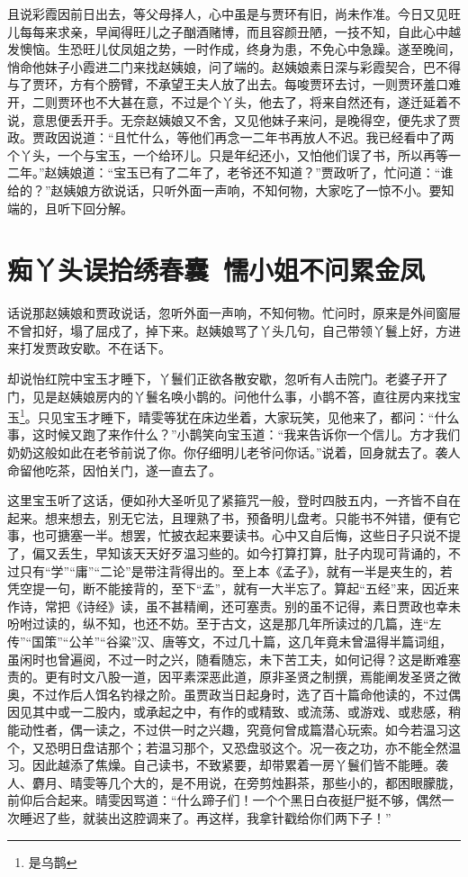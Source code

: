 \documentclass[12pt,oneside]{book}
\begin{document}
且说彩霞因前日出去，等父母择人，心中虽是与贾环有旧，尚未作准。今日又见旺儿每每来求亲，早闻得旺儿之子酗酒赌博，而且容颜丑陋，一技不知，自此心中越发懊恼。生恐旺儿仗凤姐之势，一时作成，终身为患，不免心中急躁。遂至晚间，悄命他妹子小霞进二门来找赵姨娘，问了端的。赵姨娘素日深与彩霞契合，巴不得与了贾环，方有个膀臂，不承望王夫人放了出去。每唆贾环去讨，一则贾环羞口难开，二则贾环也不大甚在意，不过是个丫头，他去了，将来自然还有，遂迁延着不说，意思便丢开手。无奈赵姨娘又不舍，又见他妹子来问，是晚得空，便先求了贾政。贾政因说道：“且忙什么，等他们再念一二年书再放人不迟。我已经看中了两个丫头，一个与宝玉，一个给环儿。只是年纪还小，又怕他们误了书，所以再等一二年。”赵姨娘道：“宝玉已有了二年了，老爷还不知道？”贾政听了，忙问道：“谁给的？”赵姨娘方欲说话，只听外面一声响，不知何物，大家吃了一惊不小。要知端的，且听下回分解。

\chapter{痴丫头误拾绣春囊~懦小姐不问累金凤}
话说那赵姨娘和贾政说话，忽听外面一声响，不知何物。忙问时，原来是外间窗屉不曾扣好，塌了屈戍了，掉下来。赵姨娘骂了丫头几句，自己带领丫鬟上好，方进来打发贾政安歇。不在话下。

却说怡红院中宝玉才睡下，丫鬟们正欲各散安歇，忽听有人击院门。老婆子开了门，见是赵姨娘房内的丫鬟名唤小鹊的。问他什么事，小鹊不答，直往房内来找宝玉\footnote{是乌鹊}。只见宝玉才睡下，晴雯等犹在床边坐着，大家玩笑，见他来了，都问：“什么事，这时候又跑了来作什么？”小鹊笑向宝玉道：“我来告诉你一个信儿。方才我们奶奶这般如此在老爷前说了你。你仔细明儿老爷问你话。”说着，回身就去了。袭人命留他吃茶，因怕关门，遂一直去了。

这里宝玉听了这话，便如孙大圣听见了紧箍咒一般，登时四肢五内，一齐皆不自在起来。想来想去，别无它法，且理熟了书，预备明儿盘考。只能书不舛错，便有它事，也可搪塞一半。想罢，忙披衣起来要读书。心中又自后悔，这些日子只说不提了，偏又丢生，早知该天天好歹温习些的。如今打算打算，肚子内现可背诵的，不过只有“学”“庸”“二论”是带注背得出的。至上本《孟子》，就有一半是夹生的，若凭空提一句，断不能接背的，至下“孟”，就有一大半忘了。算起“五经”来，因近来作诗，常把《诗经》读，虽不甚精阐，还可塞责。别的虽不记得，素日贾政也幸未吩咐过读的，纵不知，也还不妨。至于古文，这是那几年所读过的几篇，连“左传”“国策”“公羊”“谷粱”汉、唐等文，不过几十篇，这几年竟未曾温得半篇词组，虽闲时也曾遍阅，不过一时之兴，随看随忘，未下苦工夫，如何记得？这是断难塞责的。更有时文八股一道，因平素深恶此道，原非圣贤之制撰，焉能阐发圣贤之微奥，不过作后人饵名钓禄之阶。虽贾政当日起身时，选了百十篇命他读的，不过偶因见其中或一二股内，或承起之中，有作的或精致、或流荡、或游戏、或悲感，稍能动性者，偶一读之，不过供一时之兴趣，究竟何曾成篇潜心玩索。如今若温习这个，又恐明日盘诘那个；若温习那个，又恐盘驳这个。况一夜之功，亦不能全然温习。因此越添了焦燥。自己读书，不致紧要，却带累着一房丫鬟们皆不能睡。袭人、麝月、晴雯等几个大的，是不用说，在旁剪烛斟茶，那些小的，都困眼朦胧，前仰后合起来。晴雯因骂道：“什么蹄子们！一个个黑日白夜挺尸挺不够，偶然一次睡迟了些，就装出这腔调来了。再这样，我拿针戳给你们两下子！”
\end{document}
